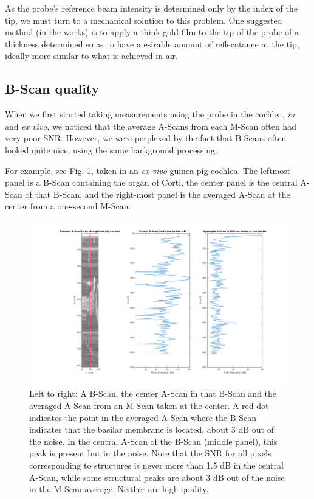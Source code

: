 \documentclass{article}
\begin{document}
\par{As the probe's reference beam intensity is determined only by the index of the tip, we must turn to a mechanical solution to this problem. One suggested method (in the works) is to apply a think gold film to the tip of the probe of a thickness determined so as to have a esirable amount of reflecatance at the tip, ideally more similar to what is achieved in air.}

\subsection{B-Scan quality}\label{BScansection}
\hypertarget{BScansection}{}

\par{When we first started taking measurements using the probe in the cochlea, \textit{in} and \textit{ex vivo}, we noticed that the average A-Scans from each M-Scan often had very poor SNR. However, we were perplexed by the fact that B-Scans often looked quite nice, using the same background processing.}

\par{For example, see Fig. \ref{bvsa}, taken in an \textit{ex vivo} guinea pig cochlea. The leftmost panel is a B-Scan containing the organ of Corti, the center panel is the central A-Scan of that B-Scan, and the right-most panel is the averaged A-Scan at the center from a one-second M-Scan.}

\begin{figure}[!h]\label{bvsa}
	\centering
	\includegraphics[width=\textwidth]{Data for Probe Writeup/Data 2022-2-17/BScan v AScan.png}
	\caption{Left to right: A B-Scan, the center A-Scan in that B-Scan and the averaged A-Scan from an M-Scan taken at the center. A red dot indicates the point in the averaged A-Scan where the B-Scan indicates that the basilar membrane is located, about 3 dB out of the noise. In the central A-Scan of the B-Scan (middle panel), this peak is present but in the noise. Note that the SNR for all pixels corresponding to structures is never more than 1.5 dB in the central A-Scan, while some structural peaks are about 3 dB out of the noise in the M-Scan average. Neither are high-quality.}
\end{figure}
\end{document}
